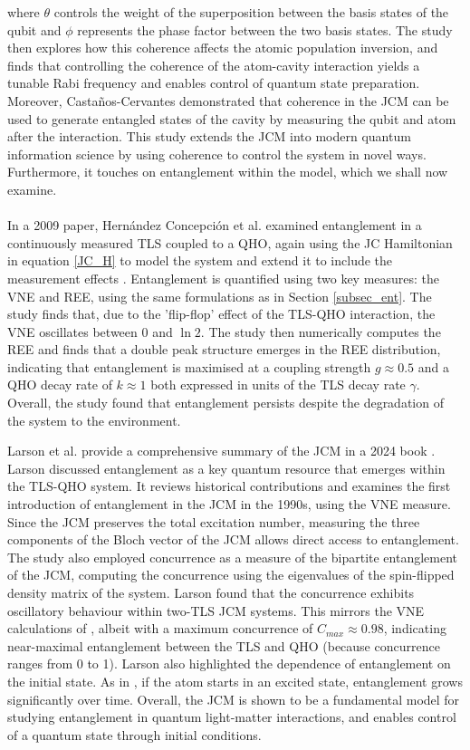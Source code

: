 \documentclass[12pt,a4paper]{article}
\begin{document}
where $\theta$ controls the weight of the superposition between the basis states of the qubit and $\phi$ represents the phase factor between the two basis states. The study then explores how this coherence affects the atomic population inversion, and finds that controlling the coherence of the atom-cavity interaction yields a tunable Rabi frequency and enables control of quantum state preparation. Moreover, Castaños-Cervantes demonstrated that coherence in the JCM can be used to generate entangled states of the cavity by measuring the qubit and atom after the interaction. This study extends the JCM into modern quantum information science by using coherence to control the system in novel ways. Furthermore, it touches on entanglement within the model, which we shall now examine.\\
\\
In a 2009 paper, Hern\'andez Concepci\'on et al. examined entanglement in a continuously measured TLS coupled to a QHO, again using the JC Hamiltonian in equation \eqref{JC_H} to model the system and extend it to include the measurement effects \cite{Entanglement2009-REE_VNapplied}. Entanglement is quantified using two key measures: the VNE and REE, using the same formulations as in Section \ref{subsec_ent}. The study finds that, due to the 'flip-flop' effect of the TLS-QHO interaction, the VNE oscillates between 0 and $\ln{2}$. The study then numerically computes the REE and finds that a double peak structure emerges in the REE distribution, indicating that entanglement is maximised at a coupling strength $g\approx0.5$ and a QHO decay rate of $k\approx1$ both expressed in units of the TLS decay rate $\gamma$. Overall, the study found that entanglement persists despite the degradation of the system to the environment. 


Larson et al. provide a comprehensive summary of the JCM in a 2024 book \cite{General2024-JC_overview}. Larson discussed entanglement as a key quantum resource that emerges within the TLS-QHO system. It reviews historical contributions and examines the first introduction of entanglement in the JCM in the 1990s, using the VNE measure. Since the JCM preserves the total excitation number, measuring the three components of the Bloch vector of the JCM allows direct access to entanglement. The study also employed concurrence as a measure of the bipartite entanglement of the JCM, computing the concurrence using the eigenvalues of the spin-flipped density matrix of the system. Larson found that the concurrence exhibits oscillatory behaviour within two-TLS JCM systems. This mirrors the VNE calculations of \cite{Entanglement2009-REE_VNapplied}, albeit with a maximum concurrence of $C_{max}\approx0.98$, indicating near-maximal entanglement between the TLS and QHO (because concurrence ranges from 0 to 1). Larson also highlighted the dependence of entanglement on the initial state. As in \cite{Entanglement2009-REE_VNapplied}, if the atom starts in an excited state, entanglement grows significantly over time. Overall, the JCM is shown to be a fundamental model for studying entanglement in quantum light-matter interactions, and enables control of a quantum state through initial conditions. 
\end{document}
